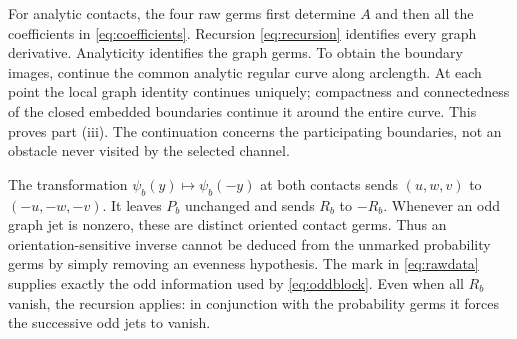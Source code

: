 For analytic contacts, the four raw germs first determine $A$ and then
all the coefficients in \eqref{eq:coefficients}. Recursion
\eqref{eq:recursion} identifies every graph derivative. Analyticity
identifies the graph germs. To obtain the boundary images, continue the
common analytic regular curve along arclength. At each point the local
graph identity continues uniquely; compactness and connectedness of
the closed embedded boundaries continue it around the entire curve.
This proves part (iii). The continuation concerns the participating
boundaries, not an obstacle never visited by the selected channel.

\begin{remark}
The transformation $\psi_b(y)\mapsto\psi_b(-y)$ at both contacts
sends $(u,w,v)$ to $(-u,-w,-v)$. It leaves $P_b$ unchanged and sends
$R_b$ to $-R_b$. Whenever an odd graph jet is nonzero, these are distinct
oriented contact germs. Thus an orientation-sensitive inverse cannot
be deduced from the unmarked probability germs by simply removing an
evenness hypothesis. The mark in \eqref{eq:rawdata} supplies exactly
the odd information used by \eqref{eq:oddblock}. Even when all $R_b$
vanish, the recursion applies: in conjunction with the probability
germs it forces the successive odd jets to vanish.
\end{remark}
